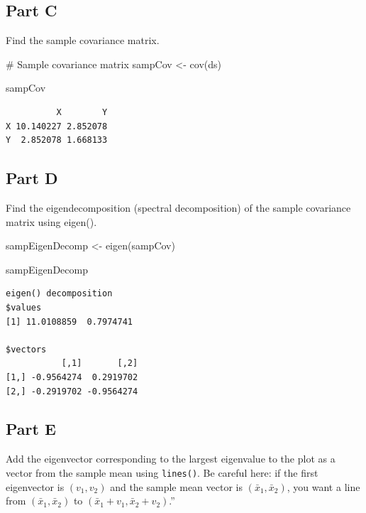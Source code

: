 \documentclass[
  letterpaper,
  DIV=11,
  numbers=noendperiod]{scrartcl}
\newenvironment{Shaded}{}{}
\newcommand{\CommentTok}[1]{\textcolor[rgb]{0.57,0.51,0.45}{#1}}
\newcommand{\FunctionTok}[1]{\textcolor[rgb]{0.41,0.62,0.42}{#1}}
\newcommand{\NormalTok}[1]{\textcolor[rgb]{0.24,0.22,0.21}{#1}}
\newcommand{\OtherTok}[1]{\textcolor[rgb]{0.41,0.62,0.42}{#1}}
\begin{document}
\newpage{}

\hypertarget{part-c}{%
\subsection{Part C}\label{part-c}}

Find the sample covariance matrix.

\begin{Shaded}
\begin{Highlighting}[]
\CommentTok{\# Sample covariance matrix}
\NormalTok{sampCov }\OtherTok{\textless{}{-}} \FunctionTok{cov}\NormalTok{(ds)}

\NormalTok{sampCov}
\end{Highlighting}
\end{Shaded}

\begin{verbatim}
          X        Y
X 10.140227 2.852078
Y  2.852078 1.668133
\end{verbatim}

\newpage{}

\hypertarget{part-d}{%
\subsection{Part D}\label{part-d}}

Find the eigendecomposition (spectral decomposition) of the sample
covariance matrix using eigen().

\begin{Shaded}
\begin{Highlighting}[]
\NormalTok{sampEigenDecomp }\OtherTok{\textless{}{-}} \FunctionTok{eigen}\NormalTok{(sampCov)}

\NormalTok{sampEigenDecomp}
\end{Highlighting}
\end{Shaded}

\begin{verbatim}
eigen() decomposition
$values
[1] 11.0108859  0.7974741

$vectors
           [,1]       [,2]
[1,] -0.9564274  0.2919702
[2,] -0.2919702 -0.9564274
\end{verbatim}

\newpage{}

\hypertarget{part-e}{%
\subsection{Part E}\label{part-e}}

Add the eigenvector corresponding to the largest eigenvalue to the plot
as a vector from the sample mean using \texttt{lines()}. Be careful
here: if the first eigenvector is \((v_1, v_2)\) and the sample mean
vector is \((\bar{x}_1, \bar{x}_2)\), you want a line from
\((\bar{x}_1, \bar{x}_2)\) to \((\bar{x}_1 + v_1, \bar{x}_2 + v_2)\).''
\end{document}
